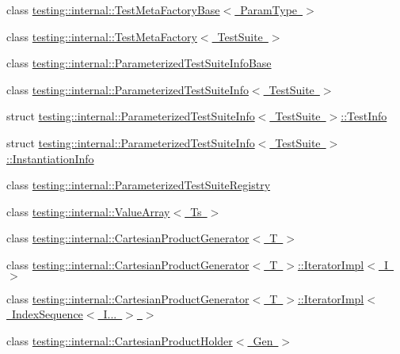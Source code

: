 \begin{DoxyCompactItemize}
\item 
class \mbox{\hyperlink{classtesting_1_1internal_1_1_test_meta_factory_base}{testing\+::internal\+::\+Test\+Meta\+Factory\+Base$<$ Param\+Type $>$}}
\item 
class \mbox{\hyperlink{classtesting_1_1internal_1_1_test_meta_factory}{testing\+::internal\+::\+Test\+Meta\+Factory$<$ Test\+Suite $>$}}
\item 
class \mbox{\hyperlink{classtesting_1_1internal_1_1_parameterized_test_suite_info_base}{testing\+::internal\+::\+Parameterized\+Test\+Suite\+Info\+Base}}
\item 
class \mbox{\hyperlink{classtesting_1_1internal_1_1_parameterized_test_suite_info}{testing\+::internal\+::\+Parameterized\+Test\+Suite\+Info$<$ Test\+Suite $>$}}
\item 
struct \mbox{\hyperlink{structtesting_1_1internal_1_1_parameterized_test_suite_info_1_1_test_info}{testing\+::internal\+::\+Parameterized\+Test\+Suite\+Info$<$ Test\+Suite $>$\+::\+Test\+Info}}
\item 
struct \mbox{\hyperlink{structtesting_1_1internal_1_1_parameterized_test_suite_info_1_1_instantiation_info}{testing\+::internal\+::\+Parameterized\+Test\+Suite\+Info$<$ Test\+Suite $>$\+::\+Instantiation\+Info}}
\item 
class \mbox{\hyperlink{classtesting_1_1internal_1_1_parameterized_test_suite_registry}{testing\+::internal\+::\+Parameterized\+Test\+Suite\+Registry}}
\item 
class \mbox{\hyperlink{classtesting_1_1internal_1_1_value_array}{testing\+::internal\+::\+Value\+Array$<$ Ts $>$}}
\item 
class \mbox{\hyperlink{classtesting_1_1internal_1_1_cartesian_product_generator}{testing\+::internal\+::\+Cartesian\+Product\+Generator$<$ T $>$}}
\item 
class \mbox{\hyperlink{classtesting_1_1internal_1_1_cartesian_product_generator_1_1_iterator_impl}{testing\+::internal\+::\+Cartesian\+Product\+Generator$<$ T $>$\+::\+Iterator\+Impl$<$ I $>$}}
\item 
class \mbox{\hyperlink{classtesting_1_1internal_1_1_cartesian_product_generator_1_1_iterator_impl_3_01_index_sequence_3_01_i_8_8_8_01_4_01_4}{testing\+::internal\+::\+Cartesian\+Product\+Generator$<$ T $>$\+::\+Iterator\+Impl$<$ Index\+Sequence$<$ I... $>$ $>$}}
\item 
class \mbox{\hyperlink{classtesting_1_1internal_1_1_cartesian_product_holder}{testing\+::internal\+::\+Cartesian\+Product\+Holder$<$ Gen $>$}}
\end{DoxyCompactItemize}
